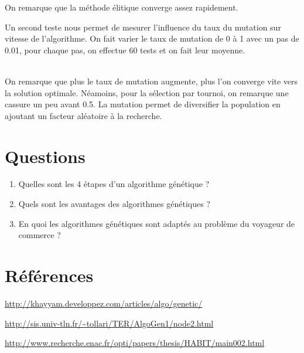 \documentclass{article}
\begin{document}
	On remarque que la méthode élitique converge assez rapidement.

	Un second teste nous permet de mesurer l'influence du taux du mutation sur vitesse de l'algorithme. On fait varier le taux de mutation de 0 à 1 avec un pas de 0.01, pour chaque pas, on effectue 60 tests et on fait leur moyenne.
    \begin{figure}[!h]
        \begin{center}
        \end{center}
    \end{figure}
    \\
    On remarque que plus le taux de mutation augmente, plus l'on converge vite vers la solution optimale. Néamoins, pour la sélection par tournoi, on remarque une cassure un peu avant 0.5.
    La mutation permet de diversifier la population en ajoutant un facteur aléatoire à la recherche.

\section{Questions}

\begin{enumerate}
\item Quelles sont les 4 étapes d'un algorithme génétique ?
\item Quels sont les avantages des algorithmes génétiques ?
\item En quoi les algorithmes génétiques sont adaptés au problème du voyageur de commerce ?
\end{enumerate}

\section{Références}
	\url{http://khayyam.developpez.com/articles/algo/genetic/}

	\url{http://sis.univ-tln.fr/~tollari/TER/AlgoGen1/node2.html}

	\url{http://www.recherche.enac.fr/opti/papers/thesis/HABIT/main002.html}
\end{document}
